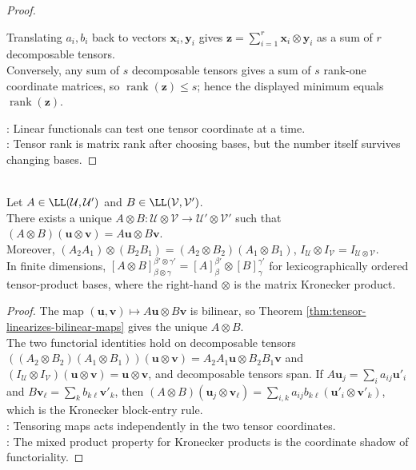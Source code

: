 \begin{theorem}
\begin{proof}
\begin{enumerate}[label=(\roman*)]
Translating $a_i,b_i$ back to vectors $\mathbf{x}_i,\mathbf{y}_i$ gives $\mathbf{z}=\sum\limits_{i=1}^{r}\mathbf{x}_i\otimes\mathbf{y}_i$ as a sum of $r$ decomposable tensors.\\
Conversely, any sum of $s$ decomposable tensors gives a sum of $s$ rank-one coordinate matrices, so $\operatorname{rank}(\mathbf{z})\le s$; hence the displayed minimum equals $\operatorname{rank}(\mathbf{z})$.
\end{enumerate}
: Linear functionals can test one tensor coordinate at a time.\\
: Tensor rank is matrix rank after choosing bases, but the number itself survives changing bases.
\end{proof}
\end{theorem}

\begin{theorem} \label{thm:tensor-product-of-linear-maps} \\
Let $A\in\LL(\mathcal{U},\mathcal{U}')$ and $B\in\LL(\mathcal{V},\mathcal{V}')$.\\
There exists a unique $A\otimes B:\mathcal{U}\otimes\mathcal{V}\to\mathcal{U}'\otimes\mathcal{V}'$ such that $(A\otimes B)(\mathbf{u}\otimes\mathbf{v})=A\mathbf{u}\otimes B\mathbf{v}$.\\
Moreover, $(A_2A_1)\otimes(B_2B_1)=(A_2\otimes B_2)(A_1\otimes B_1)$, $I_{\mathcal{U}}\otimes I_{\mathcal{V}}=I_{\mathcal{U}\otimes\mathcal{V}}$.\\
In finite dimensions, $[A\otimes B]_{\beta\otimes\gamma}^{\beta'\otimes\gamma'}=[A]_{\beta}^{\beta'}\otimes[B]_{\gamma}^{\gamma'}$ for lexicographically ordered tensor-product bases, where the right-hand $\otimes$ is the matrix Kronecker product.
\begin{proof}
The map $(\mathbf{u},\mathbf{v})\mapsto A\mathbf{u}\otimes B\mathbf{v}$ is bilinear, so Theorem \ref{thm:tensor-linearizes-bilinear-maps} gives the unique $A\otimes B$.\\
The two functorial identities hold on decomposable tensors $((A_2\otimes B_2)(A_1\otimes B_1))(\mathbf{u}\otimes\mathbf{v})=A_2A_1\mathbf{u}\otimes B_2B_1\mathbf{v}$ and $(I_{\mathcal{U}}\otimes I_{\mathcal{V}})(\mathbf{u}\otimes\mathbf{v})=\mathbf{u}\otimes\mathbf{v}$, and decomposable tensors span. If $A\mathbf{u}_j=\sum_i a_{ij}\mathbf{u}'_i$ and $B\mathbf{v}_\ell=\sum_k b_{k\ell}\mathbf{v}'_k$, then $(A\otimes B)(\mathbf{u}_j\otimes\mathbf{v}_{\ell}) =\sum_{i,k}a_{ij}b_{k\ell}(\mathbf{u}'_i\otimes\mathbf{v}'_k)$, which is the Kronecker block-entry rule.\\
: Tensoring maps acts independently in the two tensor coordinates.\\
: The mixed product property for Kronecker products is the coordinate shadow of functoriality.
\end{proof}
\end{theorem}

